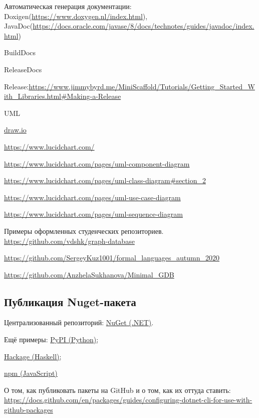 Автоматическая генерация документации: Doxigen(\url{https://www.doxygen.nl/index.html}),
JavaDoc(\url{https://docs.oracle.com/javase/8/docs/technotes/guides/javadoc/index.html})

BuildDocs

ReleaseDocs

Release:\url{https://www.jimmybyrd.me/MiniScaffold/Tutorials/Getting_Started_With_Libraries.html#Making-a-Release}

UML

\url{draw.io}

\url{https://www.lucidchart.com/}

\url{https://www.lucidchart.com/pages/uml-component-diagram}

\url{https://www.lucidchart.com/pages/uml-class-diagram#section_2}

\url{https://www.lucidchart.com/pages/uml-use-case-diagram}

\url{https://www.lucidchart.com/pages/uml-sequence-diagram}


Примеры оформленных студенческих репозиториев.
\url{https://github.com/vdshk/graph-database}

\url{https://github.com/SergeyKuz1001/formal_languages_autumn_2020}

\url{https://github.com/AnzhelaSukhanova/Minimal_GDB}


\subsection{Публикация Nuget-пакета}

Централизованный репозиторий: \href{https://www.nuget.org/}{NuGet (.NET)}.

Ещё примеры: \href{https://pypi.org/}{PyPI (Python)}; 

\href{https://hackage.haskell.org/}{Hackage (Haskell)}; 

\href{https://www.npmjs.com/}{npm (JavaScript)}


О том, как публиковать пакеты на GitHub и о том, как их оттуда ставить: \url{https://docs.github.com/en/packages/guides/configuring-dotnet-cli-for-use-with-github-packages}